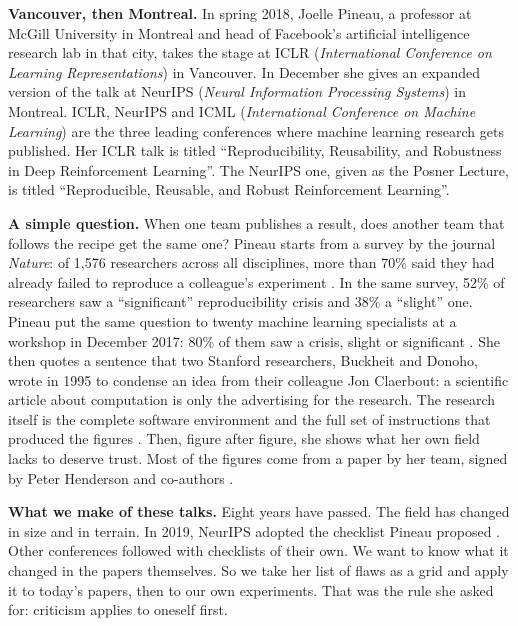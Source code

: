\documentclass[11pt,a4paper]{article}
\begin{document}
\textbf{Vancouver, then Montreal.} In spring 2018, Joelle Pineau, a
professor at McGill University in Montreal and head of Facebook's
artificial intelligence research lab in that city, takes the stage at
ICLR (\emph{International Conference on Learning Representations}) in
Vancouver. In December she gives an expanded version of the talk at
NeurIPS (\emph{Neural Information Processing Systems}) in Montreal.
ICLR, NeurIPS and ICML (\emph{International Conference on Machine
Learning}) are the three leading conferences where machine learning
research gets published. Her ICLR talk is titled ``Reproducibility,
Reusability, and Robustness in Deep Reinforcement Learning''. The
NeurIPS one, given as the Posner Lecture, is titled ``Reproducible,
Reusable, and Robust Reinforcement Learning''.

\textbf{A simple question.} When one team publishes a result, does
another team that follows the recipe get the same one? Pineau starts
from a survey by the journal \emph{Nature}: of 1,576 researchers across
all disciplines, more than 70\% said they had already failed to
reproduce a colleague's experiment \autocite{baker2016reproducibility}.
In the same survey, 52\% of researchers saw a ``significant''
reproducibility crisis and 38\% a ``slight'' one. Pineau put the same
question to twenty machine learning specialists at a workshop in
December 2017: 80\% of them saw a crisis, slight or significant
\autocite{pineau2018iclr}. She then quotes a sentence that two Stanford
researchers, Buckheit and Donoho, wrote in 1995 to condense an idea from
their colleague Jon Claerbout: a scientific article about computation is
only the advertising for the research. The research itself is the
complete software environment and the full set of instructions that
produced the figures \autocite{buckheit1995wavelab}. Then, figure after
figure, she shows what her own field lacks to deserve trust. Most of the
figures come from a paper by her team, signed by Peter Henderson and
co-authors \autocite{henderson2018matters}.

\textbf{What we make of these talks.} Eight years have passed. The field
has changed in size and in terrain. In 2019, NeurIPS adopted the
checklist Pineau proposed \autocite{pineau2021improving}. Other
conferences followed with checklists of their own. We want to know what
it changed in the papers themselves. So we take her list of flaws as a
grid and apply it to today's papers, then to our own experiments. That
was the rule she asked for: criticism applies to oneself first.
\end{document}
